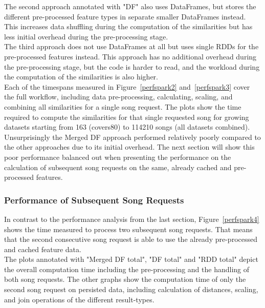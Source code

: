 \noindent The second approach annotated with "DF" also uses DataFrames, but stores the different pre-processed feature types in separate smaller DataFrames instead. This increases data shuffling during the computation of the similarities but has less initial overhead during the pre-processing stage.\\
The third approach does not use DataFrames at all but uses single RDDs for the pre-processed features instead. This approach has no additional overhead during the pre-processing stage, but the code is harder to read, and the workload during the computation of the similarities is also higher.\\
Each of the timespans measured in Figure~\ref{perfspark2} and~\ref{perfspark3} cover the full workflow, including data pre-processing, calculating, scaling, and combining all similarities for a single song request. The plots show the time required to compute the similarities for that single requested song for growing datasets starting from 163 (covers80) to 114210 songs (all datasets combined). 
\noindent Unsurprisingly the Merged DF approach performed relatively poorly compared to the other approaches due to its initial overhead. The next section will show this poor performance balanced out when presenting the performance on the calculation of subsequent song requests on the same, already cached and pre-processed features.

\subsubsection{Performance of Subsequent Song Requests}

In contrast to the performance analysis from the last section, Figure~\ref{perfspark4} shows the time measured to process two subsequent song requests. That means that the second consecutive song request is able to use the already pre-processed and cached feature data.\\ %
\noindent The plots annotated with "Merged DF total", "DF total" and "RDD total" depict the overall computation time including the pre-processing and the handling of both song requests. The other graphs show the computation time of only the second song request on persisted data, including calculation of distances, scaling, and join operations of the different result-types.

